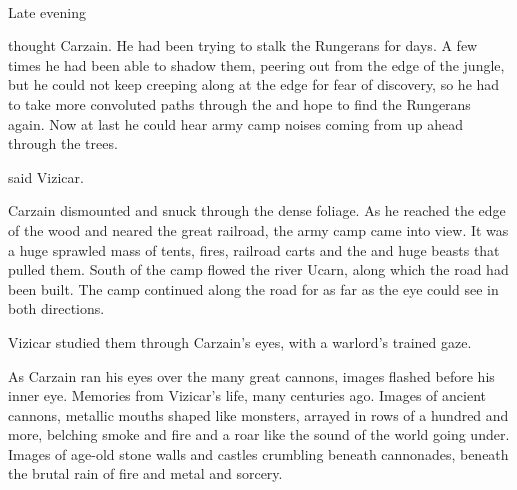 
\begin{comment}
\subsection{Carzain spies on Rungerans}
\end{comment}
\stamp
  {\dateSortieInCombat}
  {\\
   Late evening}



 thought Carzain. 
He had been trying to stalk the Rungerans for days. 
A few times he had been able to shadow them, peering out from the edge of the jungle, but he could not keep creeping along at the edge for fear of discovery, so he had to take more convoluted paths through the \wylde and hope to find the Rungerans again. 
Now at last he could hear army camp noises coming from up ahead through the trees. 


 said Vizicar.


Carzain dismounted and snuck through the dense foliage. 
As he reached the edge of the wood and neared the great railroad, the army camp came into view. 
It was a huge sprawled mass of tents, fires, railroad carts and the and huge beasts that pulled them. 
South of the camp flowed the river Ucarn, along which the road had been built. 
The camp continued along the road for as far as the eye could see in both directions. 


Vizicar studied them through Carzain's eyes, with a warlord's trained gaze.

As Carzain ran his eyes over the many great cannons, images flashed before his inner eye. 
Memories from Vizicar's life, many centuries ago. 
Images of ancient cannons, metallic mouths shaped like monsters, arrayed in rows of a hundred and more, belching smoke and fire and a roar like the sound of the world going under.
Images of age-old stone walls and castles crumbling beneath cannonades, beneath the brutal rain of fire and metal and sorcery. 

